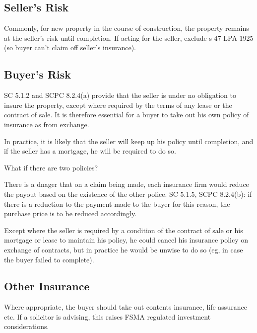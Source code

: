 \documentclass[
]{article}
\newenvironment{env-10eb25cc-82d1-4324-9372-ee64fabc8f49}
{
    \savenotes\tcolorbox[blanker,breakable,left=5pt,borderline west={2pt}{-4pt}{gray}]
}
{
    \endtcolorbox\spewnotes
}
\begin{document}
\hypertarget{sellers-risk}{%
\subsection{Seller's Risk}\label{sellers-risk}}

Commonly, for new property in the course of construction, the property
remains at the seller's risk until completion. If acting for the seller,
exclude s 47 LPA 1925 (so buyer can't claim off seller's insurance).

\hypertarget{buyers-risk}{%
\subsection{Buyer's Risk}\label{buyers-risk}}

SC 5.1.2 and SCPC 8.2.4(a) provide that the seller is under no
obligation to insure the property, except where required by the terms of
any lease or the contract of sale. It is therefore essential for a buyer
to take out his own policy of insurance as from exchange.

In practice, it is likely that the seller will keep up his policy until
completion, and if the seller has a mortgage, he will be required to do
so.

\begin{env-10eb25cc-82d1-4324-9372-ee64fabc8f49}

What if there are two policies?

There is a dnager that on a claim being made, each insurance firm would
reduce the payout based on the existence of the other police. SC 5.1.5,
SCPC 8.2.4(b): if there is a reduction to the payment made to the buyer
for this reason, the purchase price is to be reduced accordingly.

\end{env-10eb25cc-82d1-4324-9372-ee64fabc8f49}

Except where the seller is required by a condition of the contract of
sale or his mortgage or lease to maintain his policy, he could cancel
his insurance policy on exchange of contracts, but in practice he would
be unwise to do so (eg, in case the buyer failed to complete).

\hypertarget{other-insurance}{%
\subsection{Other Insurance}\label{other-insurance}}

Where appropriate, the buyer should take out contents insurance, life
assurance etc. If a solicitor is advising, this raises FSMA regulated
investment considerations.
\end{document}
